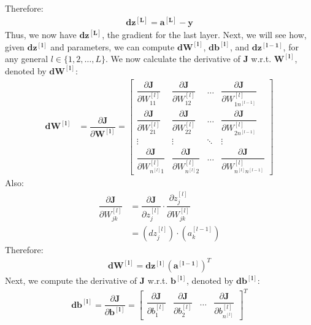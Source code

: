 \documentclass[a4paper, 12pt]{report}
\begin{document}
Therefore:
\begin{align}
\bm{dz^{\left[L\right]}} = \bm{a^{[L]}} - \bm{y}
\end{align}
Thus, we now have $\bm{dz^{\left[L\right]}}$, the gradient for the last layer. Next, we will see how, given $\bm{dz^{\left[l\right]}}$ and parameters, we can compute $\bm{dW^{\left[l\right]}}$, $\bm{db^{\left[l\right]}}$, and $\bm{dz^{\left[l-1\right]}}$, for any general $l \in \{1, 2, \dots, L\}$.
We now calculate the derivative of $\bm{J}$ w.r.t. $\bm{W^{\left[l\right]}}$, denoted by $\bm{dW^{\left[l\right]}}$:
\begin{align*}
\bm{dW^{\left[l\right]}} &= \dfrac{\partial \bm{J}}{\partial \bm{W^{\left[l\right]}}} = 
\begin{bmatrix}
\dfrac{\partial \bm{J}}{\partial W_{11}^{\left[l\right]}} &
\dfrac{\partial \bm{J}}{\partial W_{12}^{\left[l\right]}} &
\dots &
\dfrac{\partial \bm{J}}{\partial W_{1n^{[l-1]}}^{\left[l\right]}} \\
\dfrac{\partial \bm{J}}{\partial W_{21}^{\left[l\right]}} &
\dfrac{\partial \bm{J}}{\partial W_{22}^{\left[l\right]}} &
\dots &
\dfrac{\partial \bm{J}}{\partial W_{2n^{[l-1]}}^{\left[l\right]}} \\
\vdots & \vdots & \ddots & \vdots \\
\dfrac{\partial \bm{J}}{\partial W_{n^{[l]}1}^{\left[l\right]}} &
\dfrac{\partial \bm{J}}{\partial W_{n^{[l]}2}^{\left[l\right]}} &
\dots &
\dfrac{\partial \bm{J}}{\partial W_{n^{[l]}n^{[l-1]}}^{\left[l\right]}} 
\end{bmatrix}
\end{align*}
Also:
\begin{align*}
\dfrac{\partial \bm{J}}{\partial W_{jk}^{\left[l\right]}} &= \dfrac{\partial \bm{J}}{\partial z_j^{\left[l\right]}}\cdot\dfrac{\partial z_j^{\left[l\right]}}{\partial W_{jk}^{\left[l\right]}} \\
&= \left(dz_{j}^{\left[l\right]}\right)\cdot\left(a_{k}^{[l-1]}\right)
\end{align*}
Therefore:
\begin{align}
\bm{dW^{\left[l\right]}} = \bm{dz^{\left[l\right]}}(\bm{a^{[l-1]}})^T
\end{align}
Next, we compute the derivative of $\bm{J}$ w.r.t. $\bm{b^{\left[l\right]}}$, denoted by $\bm{db^{\left[l\right]}}$:
\begin{align*}
\bm{db^{\left[l\right]}} = \dfrac{\partial \bm{J}}{\partial \bm{b^{\left[l\right]}}} = 
\begin{bmatrix}
\dfrac{\partial \bm{J}}{\partial b_{1}^{\left[l\right]}} &
\dfrac{\partial \bm{J}}{\partial b_{2}^{\left[l\right]}} &
\dots &
\dfrac{\partial \bm{J}}{\partial b_{n^{[l]}}^{\left[l\right]}}
\end{bmatrix}^T
\end{align*}
\end{document}
